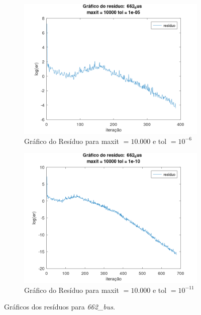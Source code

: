 \begin{figure}[H]
    \par\bigskip
    \begin{subfigure}[t]{0.4\linewidth}
         \centering
         \includegraphics[width=\textwidth]{image/662_bus_10000_-6.png}
         \caption{Gráfico do Resíduo para maxit $= 10.000$ e tol $=10^{-6}$}
         \label{fig:bus-10-6}
    \end{subfigure}
    \quad
    \begin{subfigure}[t]{0.4\linewidth}
         \centering
         \includegraphics[width=\textwidth]{image/662_bus_10000_-11.png}
         \caption{Gráfico do Resíduo para maxit $= 10.000$ e tol $=10^{-11}$}
         \label{fig:bus-10-11}
    \end{subfigure}
    \caption{Gráficos dos resíduos para \textit{662\_bus}.}
    \label{fig:bus}
\end{figure}